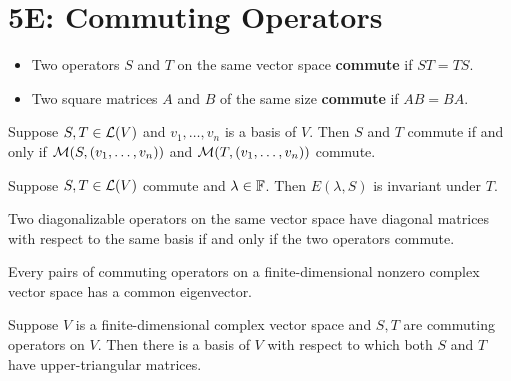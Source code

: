 \documentclass{extarticle}
\begin{document}


\newpage 
\section*{5E: Commuting Operators}


\begin{definition}[commute]
    \begin{itemize}
        \item Two operators \(S\) and \(T\) on the same vector space \textbf{commute} if \(ST = TS\).
        \item Two square matrices \(A\) and \(B\) of the same size \textbf{commute} if \(AB = BA\).
    \end{itemize}
\end{definition}

\begin{lemma}
    Suppose \(S, T \in \mathcal{L}(V)\) and \(v_1, \ldots, v_n\) is a basis of \(V\). Then \(S\) and \(T\)
    commute if and only if \(\mathcal{M}(S, (v_1, \ldots, v_n))\) and \(\mathcal{M}(T, (v_1, \ldots, v_n))\) commute.
\end{lemma}


\begin{lemma}
    Suppose \(S, T \in \mathcal{L}(V)\) commute and \(\lambda \in \mathbb{F}\). Then 
    \(E(\lambda, S)\) is invariant under \(T\).
\end{lemma}

\begin{thm}
    Two diagonalizable operators on the same vector space have diagonal matrices with 
    respect to the same basis if and only if the two operators commute.
\end{thm}


\begin{lemma}
    Every pairs of commuting operators on a finite-dimensional nonzero complex vector space has 
    a common eigenvector.
\end{lemma}


\begin{lemma}
    Suppose \(V\) is a finite-dimensional complex vector space and \(S, T\) are commuting operators on 
    \(V\). Then there is a basis of \(V\) with respect to which both 
    \(S\) and \(T\) have upper-triangular matrices. 
\end{lemma}
\end{document}
